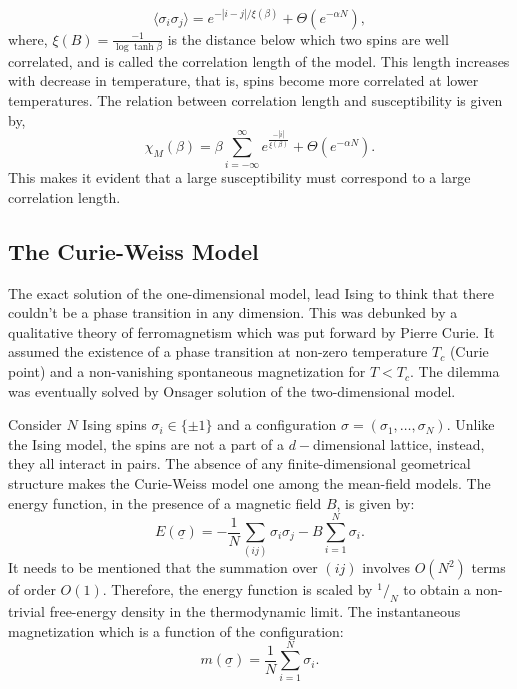 \documentclass[letterpaper,english,10pt]{article}
\begin{document}
\begin{defn}
\begin{defn}[Susceptibility]
$$\langle \sigma_{i}\sigma_{j}\rangle = e^{-|i-j|/\xi(\beta)}+ \Theta (e^{-\alpha N}),$$
where, $\xi(B) = \frac{-1}{\log \tanh \beta}$ is the distance below which two spins are well correlated, and is called the correlation length of the model. This length increases with decrease in temperature, that is, spins become more correlated at lower temperatures. The relation between correlation length and susceptibility is given by,
\begin{equation}
\chi_{M}(\beta)=\beta \sum_{i=-\infty}^{\infty}e^{\frac{-|i|}{\xi(\beta)}}+\Theta(e^{-\alpha N}).
\end{equation}
This makes it evident that a large susceptibility must correspond to a large correlation length. 
	\end{defn}
\end{defn}
\subsection{The Curie-Weiss Model}

The exact solution of the one-dimensional model, lead Ising to think that there couldn’t be a phase transition in any dimension. This was debunked by a qualitative theory of ferromagnetism which was put forward by Pierre Curie. It assumed the existence of a phase transition at non-zero temperature $T_{c}$ (Curie point) and a non-vanishing spontaneous magnetization for $T<T_{c}$. The dilemma was eventually solved by Onsager solution of the two-dimensional model. 

Consider $N$ Ising spins $\sigma_{i}\in \{\pm 1\}$ and a configuration $\sigma = (\sigma_{1},\hdots,\sigma_{N})$. Unlike the Ising model, the spins are not a part of a $d-$dimensional lattice, instead, they all interact in pairs. The absence of any finite-dimensional geometrical structure makes the Curie-Weiss model one among the mean-field models. The energy function, in the presence of a magnetic field $B$, is given by:
$$E(\underline{\sigma}) = -\frac{1}{N}\sum_{(ij)}\sigma_{i}\sigma_{j}-B\sum_{i=1}^{N}\sigma_{i}.$$ 
It needs to be mentioned that the summation over $(ij)$ involves $O(N^{2})$ terms of order $O(1)$. Therefore, the energy function is scaled by $^1/_N$ to obtain a non-trivial free-energy density in the thermodynamic limit. The instantaneous magnetization which is a function of the configuration:
$$m(\underline{\sigma}) = \frac{1}{N}\sum_{i=1}^{N}\sigma_{i}.$$
\end{document}
